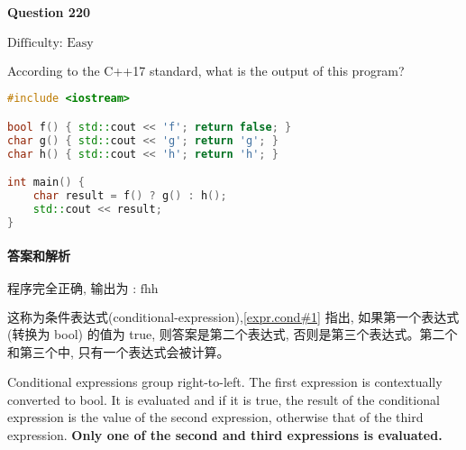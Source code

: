 \documentclass{article}
\begin{document}
	
	\paragraph*{Question 220} $\boxed{\text{Difficulty: Easy}} $			
	
	According to the C++17 standard, what is the output of this program?
	
	\begin{lstlisting}[language=C++]  		
#include <iostream>

bool f() { std::cout << 'f'; return false; }
char g() { std::cout << 'g'; return 'g'; }
char h() { std::cout << 'h'; return 'h'; }

int main() {
	char result = f() ? g() : h();
	std::cout << result;
}
	\end{lstlisting}
	
	
	\paragraph*{答案和解析} $\boxed{\text{程序完全正确, 输出为 : fhh}} $
	
	这称为条件表达式(conditional-expression),\href{https://timsong-cpp.github.io/cppwp/n4659/expr.cond#1}{[expr.cond\#1]} 指出, 如果第一个表达式 (转换为 bool) 的值为 true, 则答案是第二个表达式, 否则是第三个表达式。第二个和第三个中, 只有一个表达式会被计算。
	\begin{lightgrayleftbar}
		Conditional expressions group right-to-left. The first expression is contextually converted to bool. It is evaluated and if it is true, the result of the conditional expression is the value of the second expression, otherwise that of the third expression. \textbf{Only one of the second and third expressions is evaluated.}
	\end{lightgrayleftbar}
\end{document}
